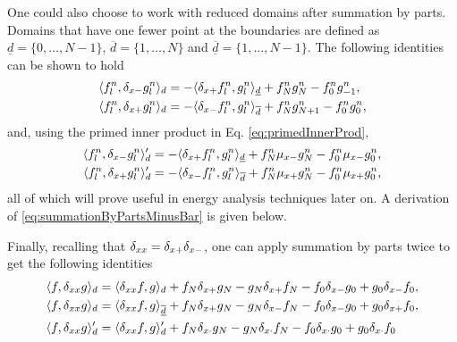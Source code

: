 One could also choose to work with reduced domains after summation by parts. Domains that have one fewer point at the boundaries are defined as $\underline{d} = \{0, \hdots, N-1\}$, 
$\overline{d} = \{1, \hdots, N\}$ and $\underline{\overline{d}} = \{1, \hdots, N-1\}$. The following identities can be shown to hold
\begin{subequations}\label{eq:summationByParts}
    \begin{align}
        \langle f_l^n, \delta_{x-} g_l^n \rangle_d  &= -\langle \delta_{x+} f_l^n, g_l^n\rangle_{\underline{d}} + f_N^ng_N^n - f_0^ng_{-1}^n,\label{eq:summationByPartsMinusBar}\\
        \langle f_l^n, \delta_{x+} g_l^n \rangle_d 
        &= -\langle \delta_{x-} f_l^n, g_l^n\rangle_{\overline{d}} + f_N^ng_{N+1}^n - f_0^ng_0^n,\label{eq:summationByPartsPlusBar}
    \end{align}
\end{subequations}
and, using the primed inner product in Eq. \eqref{eq:primedInnerProd},
\begin{subequations}
    \begin{align}
        \langle f_l^n, \delta_{x-} g_l^n \rangle_d'  = -\langle \delta_{x+} f_l^n, g_l^n \rangle_{\underline{d}}+f_N^n\mu_{x-} g_N^n-f_0^n\mu_{x-} g_0^n,\label{eq:primedIdentityMinus}\\
        \langle f_l^n, \delta_{x+} g_l^n \rangle_d'  = -\langle \delta_{x-} f_l^n, g_l^n \rangle_{\overline{d}}+f_N^n\mu_{x+} g_N^n-f_0^n\mu_{x+} g_0^n,\label{eq:primedIdentityPlus}
    \end{align}
\end{subequations}
%
all of which will prove useful in energy analysis techniques later on. A derivation of \eqref{eq:summationByPartsMinusBar} is given below. 

Finally, recalling that $\delta_{xx} = \delta_{x+}\delta_{x-}$, one can apply summation by parts twice to get the following identities
\begin{subequations}
    \begin{align}
        \langle f, \delta_{xx} g\rangle_d &= \langle \delta_{xx}f, g \rangle_d+f_N\delta_{x+}g_N-g_N\delta_{x+}f_N -f_0\delta_{x-}g_0+g_0\delta_{x-}f_0,\label{eq:summationsummationByPartsTwice}\\
        \langle f, \delta_{xx} g\rangle_d &= \langle \delta_{xx}f, g \rangle_{\underline{\overline{d}}}+f_N\delta_{x+} g_N-g_N\delta_{x-} f_N -f_0\delta_{x-} g_0+g_0\delta_{x+} f_0,\label{eq:summationByPartsTwiceReduced}\\
        \langle f, \delta_{xx} g\rangle_d' &= \langle \delta_{xx} f, g\rangle_d' + f_N\delta_{x\cdot} g_N - g_N \delta_{x\cdot} f_N - f_0 \delta_{x\cdot} g_0 + g_0 \delta_{x\cdot} f_0\label{eq:summationByPartsTwicePrimed}
    \end{align}
\end{subequations}


